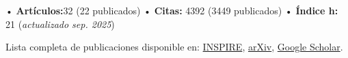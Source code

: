 

• \textbf{Artículos:}32 (22 publicados) \quad • \textbf{Citas:} 4392 (3449 publicados) \quad • \textbf{Índice h:} 21 \quad (\textit{actualizado sep. 2025})  

Lista completa de publicaciones disponible en: \href{https://inspirehep.net/authors/2107093?ui-citation-summary=true}{INSPIRE}, 
\href{https://arxiv.org/a/noriega_h_1.html}{arXiv},
\href{https://scholar.google.com/citations?user=y2QA6FUAAAAJ&hl=es}{Google Scholar}.

\vspace{0.3cm}


\nocite{*}


\printbibliography[heading={subbibliography},title={Autor principal}, keyword={major}]


\printbibheading[heading=subbibliography, title={\textsc{Autor contribuyente}\footnote{Artículos firmados como parte de la colaboración DESI debido a contribuciones a artículos clave y de soporte.}}]

